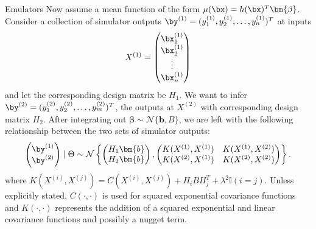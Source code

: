 \begin{chapter}{Emulators \label{Ch:Emulators}}
Now assume a mean function of the form $\mu(\bx) = h(\bx)^T \bm{\beta}$. Consider a collection of simulator outputs $\by^{(1)} = (y_1^{(1)}, y_2^{(1)}, \ldots, y_n^{(1)})^T$ at inputs
\begin{equation}
  X^{(1)} = \begin{pmatrix} \bx_1^{(1)} \\ \bx_2^{(1)} \\ \vdots \\ \bx_n^{(1)} \end{pmatrix}
\end{equation} and let the corresponding design matrix be $H_1$. We want to infer $\by^{(2)} = (y_1^{(2)}, y_2^{(2)}, \ldots, y_m^{(2)})^T$, the outputs at $X^{(2)}$ with corresponding design matrix $H_2$. After integrating out $\bm{\beta} \sim \mathcal{N}\{ \bm{b}, B\}$, we are left with the following relationship between the two sets of simulator outputs:
\begin{equation}
  \begin{pmatrix}
    \by^{(1)} \\ \by^{(2)}
  \end{pmatrix} \mid \Theta \sim \mathcal{N} \left\{
   \begin{pmatrix}
    H_1 \bm{b} \\ H_2 \bm{b}
  \end{pmatrix}, \begin{pmatrix} K(X^{(1)}, X^{(1)}) & K(X^{(1)}, X^{(2)}) \\
K(X^{(2)}, X^{(1)}) & K(X^{(2)}, X^{(2)}) \end{pmatrix} \right\}.
\end{equation}
where $K(X^{(i)}, X^{(j)}) = C(X^{(i)}, X^{(j)}) + H_i B H_j^T + \lambda^2 \mathbb{I}(i = j)$. Unless explicitly stated, $C(\cdot, \cdot)$ is used for squared exponential covariance functions and $K(\cdot, \cdot)$ represents the addition of a squared exponential and linear covariance functions and possibly a nugget term.


\end{chapter}
